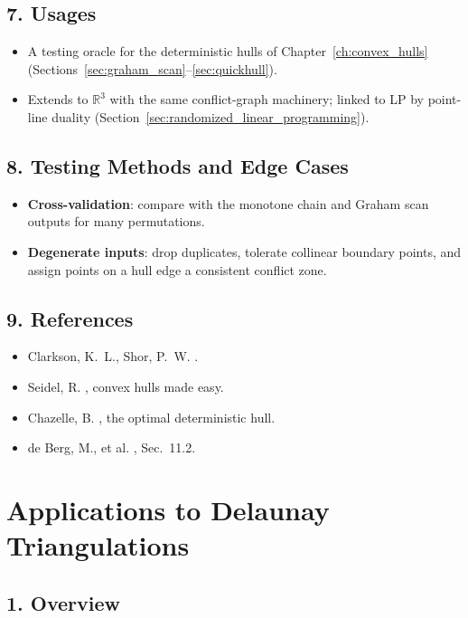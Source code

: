 \subsection{7. Usages}

\begin{itemize}
\item A testing oracle for the deterministic hulls of
  Chapter~\ref{ch:convex_hulls} (Sections~\ref{sec:graham_scan}--\ref{sec:quickhull}).
\item Extends to $\mathbb{R}^3$ with the same conflict-graph machinery; linked
  to LP by point-line duality (Section~\ref{sec:randomized_linear_programming}).
\end{itemize}

\subsection{8. Testing Methods and Edge Cases}

\begin{itemize}
\item \textbf{Cross-validation}: compare with the monotone chain and Graham
  scan outputs for many permutations.
\item \textbf{Degenerate inputs}: drop duplicates, tolerate collinear boundary
  points, and assign points on a hull edge a consistent conflict zone.
\end{itemize}

\subsection{9. References}

\begin{itemize}
\item Clarkson, K.~L., Shor, P.~W. \cite{clarkson1989}.
\item Seidel, R. \cite{seidel1990}, convex hulls made easy.
\item Chazelle, B. \cite{chazelle1993}, the optimal deterministic hull.
\item de Berg, M., et al. \cite{deberg2008}, Sec.~11.2.
\end{itemize}

\section{Applications to Delaunay Triangulations}
\label{sec:randomized_delaunay}

\subsection{1. Overview}

